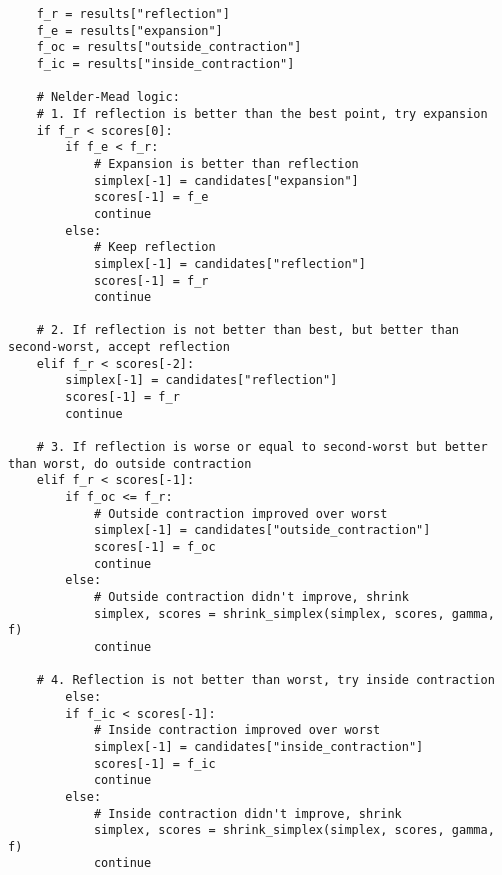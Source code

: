 \begin{lstlisting}
	f_r = results["reflection"]
	f_e = results["expansion"]
	f_oc = results["outside_contraction"]
	f_ic = results["inside_contraction"]
	
	# Nelder-Mead logic:
	# 1. If reflection is better than the best point, try expansion
	if f_r < scores[0]:
		if f_e < f_r:
			# Expansion is better than reflection
			simplex[-1] = candidates["expansion"]
			scores[-1] = f_e
			continue
		else:
			# Keep reflection
			simplex[-1] = candidates["reflection"]
			scores[-1] = f_r
			continue
	
	# 2. If reflection is not better than best, but better than second-worst, accept reflection
	elif f_r < scores[-2]:
		simplex[-1] = candidates["reflection"]
		scores[-1] = f_r
		continue
	
	# 3. If reflection is worse or equal to second-worst but better than worst, do outside contraction
	elif f_r < scores[-1]:
		if f_oc <= f_r:
			# Outside contraction improved over worst
			simplex[-1] = candidates["outside_contraction"]
			scores[-1] = f_oc
			continue
		else:
			# Outside contraction didn't improve, shrink
			simplex, scores = shrink_simplex(simplex, scores, gamma, f)
			continue
	
	# 4. Reflection is not better than worst, try inside contraction
		else:
		if f_ic < scores[-1]:
			# Inside contraction improved over worst
			simplex[-1] = candidates["inside_contraction"]
			scores[-1] = f_ic
			continue
		else:
			# Inside contraction didn't improve, shrink
			simplex, scores = shrink_simplex(simplex, scores, gamma, f)
			continue
\end{lstlisting}